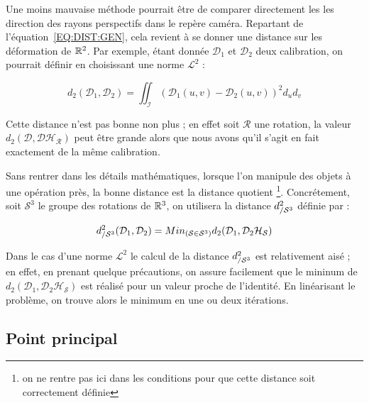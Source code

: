 Une moins mauvaise m\'ethode pourrait \^etre de comparer directement les 
les direction des rayons perspectifs dans le rep\`ere cam\'era.
Repartant de l'\'equation~\ref{EQ:DIST:GEN}, cela revient \`a se
donner une distance sur les d\'eformation de $\RR^2$.
Par exemple, \'etant donn\'ee $\mathcal{D}_1$ et $\mathcal{D}_2$
deux calibration, on pourrait d\'efinir en choisissant une norme $\mathcal{L}^2$ :

\begin{equation}
   d_2(\mathcal{D}_1,\mathcal{D}_2) =  
      \iint_{\mathcal{I}} (\mathcal{D}_1(u,v)-\mathcal{D}_2(u,v))^2 d_u d_v
\end{equation}

Cette distance n'est pas bonne non plus ; en effet  soit $\mathcal{R}$
une rotation, la valeur $d_2(\mathcal{D},\mathcal{D} \mathcal{H_R})$ peut
\^etre grande alors que nous avons qu'il s'agit en fait exactement de la m\^eme
calibration.

Sans rentrer dans les d\'etails math\'ematiques, 
lorsque l'on manipule des objets
\`a une op\'eration pr\`es, la bonne distance est la distance quotient
\footnote{on ne rentre pas ici dans les conditions pour que cette
distance soit correctement d\'efinie}. Concr\'etement, soit 
$\mathcal{S}^3$ le groupe des rotations de $\RR^3$, on utilisera
la distance $\DdSt$ d\'efinie par  :


\begin{equation}
   \DdSt(\mathcal{D}_1,\mathcal{D}_2) 
   = Min_{(\mathcal{S} \in \mathcal{S}^3)} d_2(\mathcal{D}_1,\mathcal{D}_2 \mathcal{H_S})
\end{equation}

Dans le cas d'une norme  $\mathcal{L}^2$ le calcul de la 
distance $\DdSt$ est relativement ais\'e ; en effet, en prenant
quelque pr\'ecautions, on assure facilement que  le mininum de 
$d_2(\mathcal{D}_1,\mathcal{D}_2 \mathcal{H_S})$ est r\'ealis\'e
pour un valeur proche de l'identit\'e. En lin\'earisant le probl\`eme,
on trouve alors le minimum en une ou deux it\'erations.


\subsection{Point principal}

